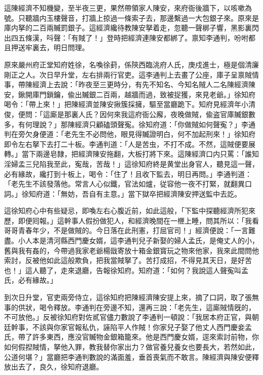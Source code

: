 這陳經濟不知機變，至半夜三更，果然帶領家人陳安，來府衙後牆下，以咳嗽為號。只聽牆内玉樓聲音，打牆上掠過一條索子去，那邊繫過一大包銀子來。原來是庫内拏的二百兩贓罰銀子。這經濟纔待教陳安拏着走，忽聽一聲梆子響，黑影裏閃出四五條漢，呌聲：「有賊了！」登時把經濟連陳安都綁了。禀知李通判，吩咐都且押送牢裏去，明日問理。

原來嚴州府正堂知府姓徐，名喚徐葑，係陝西臨洮府人氏，庚戍進士，極是個清廉剛正之人。次日早升堂，左右排兩行官吏。這李通判上去畫了公座，庫子呈禀賊情事，帶陳經濟上去說：「昨夜至三更時分，有先不知名、今知名賊人二名陳經濟陳安，鍬開庫門鎖鑰，偸出贓銀二百兩，越牆而過，致被捉獲，來見老爺。」徐知府喝令：「帶上來！」把陳經濟並陳安揪簇採擁，驅至當廳跪下。知府見經濟年小清俊，便問：「這廝是那裏人氏？因何來我這府衙公廨，夜晚做賊，偸盗官庫贓銀數多，有何理說？」那陳經濟只顧磕頭聲寃。徐知府道：「你做賊如何聲寃？」李通判在旁欠身便道：「老先生不必問他，眼見得贓證明白，何不加起刑來！」徐知府即令左右拏下去打二十板。李通判道：「人是苦虫，不打不成。不然，這賊便要展轉。」當下兩邊皂隸，把經濟陳安拖翻，大板打將下來。這陳經濟口内只罵：「誰知淫婦孟三兒陷我至此，寃哉，苦哉！」這徐知府終是黄堂出身官人，聽見這一聲，必有緣故，纔打到十板上，喝令：「住了！且收下監去，明日再問。」李通判道：「老先生不該發落他。常言人心似鐵，官法如爐，従容他一夜不打緊，就翻異口詞。」徐知府道：「無妨，吾自有主意。」當下獄卒把經濟陳安押送監中去訖。

這徐知府心中有些疑忌，即喚左右心腹近前，如此這般，「下監中探聽經濟所犯來歷，即便囘報。」這幹事人假扮做犯人，和經濟晚間在一㭱上睡，問其所以：「我看哥哥青春年少，不是做賊的。今日落在此刑憲，打屈官司！」經濟便說：「一言難盡。小人本是清河縣西門慶女婿，這李通判兒子新娶的婦人孟氏，是俺丈人的小，舊與我有姦的，今帶過我家老爺楊戩寄放十箱金銀寳玩之物來他家，我來此間問他索討，反被他如此這般欺負，把我當賊拏了。苦打成招，不得見其天日，是好苦也！」這人聽了，走來退廳，告報徐知府。知府道：「如何？我說這人聲寃叫孟氏，必有緣故。」

到次日升堂，官吏兩旁侍立，這徐知府把陳經濟陳安提上來，摘了口詞，取了張無事的供狀，喝令釋放。李通判在旁邊不知，還再三說：「老先生，這廝賊情旣的，不可放他。」反被徐知府對佐貳官儘力數說了李通判一頓說：「我居本府正官，與朝廷幹事，不該與你家官報私仇，誣陷平人作賊！你家兒子娶了他丈人西門慶妾孟氏，帶了許多東西，應没官贓物金銀箱籠來。他是西門慶女婿，逕來索討前物，你如何假揑賊情，拏他入罪，教我替你家出力？做官養兒養女也要長大，若然如此，公道何堪？」當廳把李通判數說的滿面羞，垂首喪氣而不敢言。陳經濟與陳安便釋放出去了，良久，徐知府退廳。

